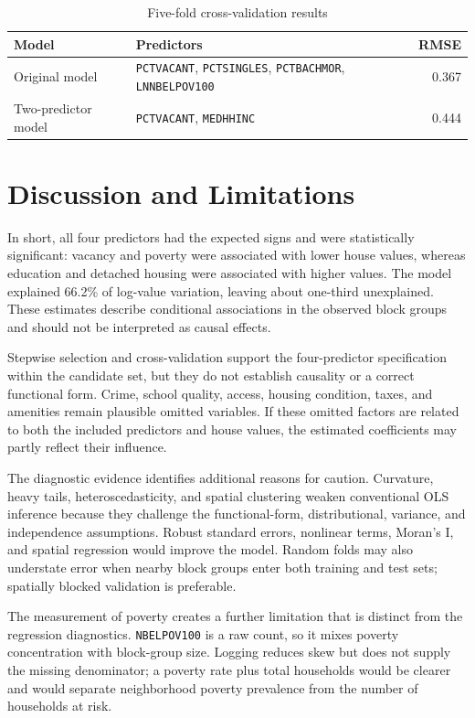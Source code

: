 \documentclass[11pt]{article}
\newcommand{\var}[1]{\texttt{#1}}
\begin{document}
\begin{table}[H]
\centering
\caption{Five-fold cross-validation results}
\label{tab:cv}
\begin{tabularx}{\textwidth}{lXr}
\toprule
Model & Predictors & RMSE \\
\midrule
Original model & \var{PCTVACANT}, \var{PCTSINGLES}, \var{PCTBACHMOR}, \var{LNNBELPOV100} & 0.367 \\
Two-predictor model & \var{PCTVACANT}, \var{MEDHHINC} & 0.444 \\
\bottomrule
\end{tabularx}
\end{table}

\section{Discussion and Limitations}

In short, all four predictors had the expected signs and were statistically significant: vacancy and poverty were associated with lower house values, whereas education and detached housing were associated with higher values. The model explained 66.2\% of log-value variation, leaving about one-third unexplained. These estimates describe conditional associations in the observed block groups and should not be interpreted as causal effects.

Stepwise selection and cross-validation support the four-predictor specification within the candidate set, but they do not establish causality or a correct functional form. Crime, school quality, access, housing condition, taxes, and amenities remain plausible omitted variables. If these omitted factors are related to both the included predictors and house values, the estimated coefficients may partly reflect their influence.

The diagnostic evidence identifies additional reasons for caution. Curvature, heavy tails, heteroscedasticity, and spatial clustering weaken conventional OLS inference because they challenge the functional-form, distributional, variance, and independence assumptions. Robust standard errors, nonlinear terms, Moran's I, and spatial regression would improve the model. Random folds may also understate error when nearby block groups enter both training and test sets; spatially blocked validation is preferable.

The measurement of poverty creates a further limitation that is distinct from the regression diagnostics. \var{NBELPOV100} is a raw count, so it mixes poverty concentration with block-group size. Logging reduces skew but does not supply the missing denominator; a poverty rate plus total households would be clearer and would separate neighborhood poverty prevalence from the number of households at risk.
\end{document}
